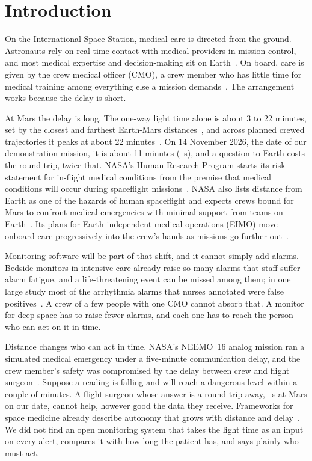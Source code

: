 \section{Introduction}\label{sec:intro}

On the International Space Station, medical care is directed from the ground. Astronauts rely on real-time contact with medical providers in mission control, and most medical expertise and decision-making sit on Earth~\cite{russell2023cdss,sirek2021autonomy}. On board, care is given by the crew medical officer (CMO), a crew member who has little time for medical training among everything else a mission demands~\cite{russell2023cdss}. The arrangement works because the delay is short.

At Mars the delay is long. The one-way light time alone is about 3 to 22 minutes, set by the closest and farthest Earth-Mars distances~\cite{nssdcMars}, and across planned crewed trajectories it peaks at about 22 minutes~\cite{mcbrayer2022delay}. On 14 November 2026, the date of our demonstration mission, it is about 11 minutes (\numMarsOneWayS~s), and a question to Earth costs the round trip, twice that. NASA's Human Research Program starts its risk statement for in-flight medical conditions from the premise that medical conditions will occur during spaceflight missions~\cite{antonsen2017risk}. NASA also lists distance from Earth as one of the hazards of human spaceflight and expects crews bound for Mars to confront medical emergencies with minimal support from teams on Earth~\cite{hrpDistance}. Its plans for Earth-independent medical operations (EIMO) move onboard care progressively into the crew's hands as missions go further out~\cite{levin2023eimo,lemery2024eimo}.

Monitoring software will be part of that shift, and it cannot simply add alarms. Bedside monitors in intensive care already raise so many alarms that staff suffer alarm fatigue, and a life-threatening event can be missed among them; in one large study most of the arrhythmia alarms that nurses annotated were false positives~\cite{drew2014alarm}. A crew of a few people with one CMO cannot absorb that. A monitor for deep space has to raise fewer alarms, and each one has to reach the person who can act on it in time.

Distance changes who can act in time. NASA's NEEMO~16 analog mission ran a simulated medical emergency under a five-minute communication delay, and the crew member's safety was compromised by the delay between crew and flight surgeon~\cite{rader2013delay}. Suppose a reading is falling and will reach a dangerous level within a couple of minutes. A flight surgeon whose answer is a round trip away, \numMarsRoundTripS~s at Mars on our date, cannot help, however good the data they receive. Frameworks for space medicine already describe autonomy that grows with distance and delay~\cite{levin2023eimo,cypko2025}. We did not find an open monitoring system that takes the light time as an input on every alert, compares it with how long the patient has, and says plainly who must act.

